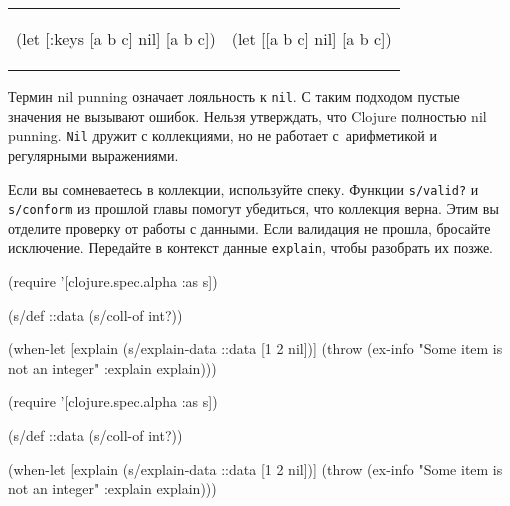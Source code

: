 \else

\begin{english}
\noindent
\begin{tabular}{ @{}p{5cm} @{}p{5cm} }

  \begin{clojure}
(let [{:keys [a b c]} nil]
  [a b c])
  \end{clojure}

&

  \begin{clojure}
(let [[a b c] nil]
  [a b c])
  \end{clojure}

\end{tabular}

\end{english}

\fi


Термин nil punning означает лояльность к \verb|nil|. С таким подходом
пустые значения не вызывают ошибок. Нельзя утверждать, что Clojure полностью
nil punning. \verb|Nil| дружит с коллекциями, но не работает с~арифметикой
и регулярными выражениями.


Если вы сомневаетесь в коллекции, используйте спеку. Функции \verb|s/valid?| и
\verb|s/conform| из прошлой главы  помогут убедиться, что
коллекция верна. Этим вы отделите проверку от работы с данными. Если валидация
не прошла, бросайте исключение. Передайте в контекст данные \verb|explain|,
чтобы разобрать их позже.

\ifx\DEVICETYPE\MOBILE

\begin{english}
  \begin{clojure}
(require '[clojure.spec.alpha :as s])

(s/def ::data (s/coll-of int?))

(when-let [explain (s/explain-data
                     ::data
                     [1 2 nil])]
  (throw (ex-info
           "Some item is not an integer"
           {:explain explain})))
  \end{clojure}
\end{english}

\else

\begin{english}
  \begin{clojure}
(require '[clojure.spec.alpha :as s])

(s/def ::data (s/coll-of int?))

(when-let [explain (s/explain-data ::data [1 2 nil])]
  (throw (ex-info "Some item is not an integer"
                  {:explain explain})))
  \end{clojure}
\end{english}

